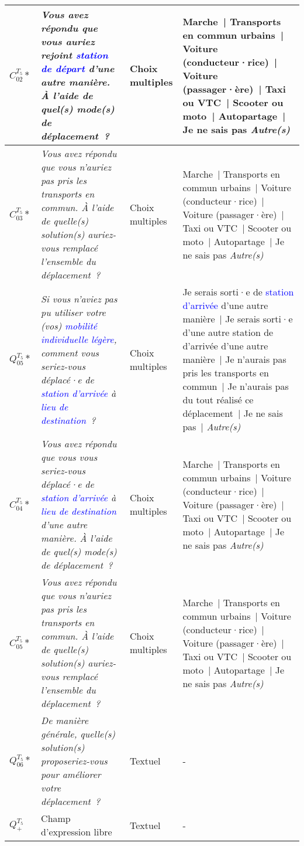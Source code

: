 \begin{table}[h!]
{\begin{tabular}{p{}p{}p{}p{}}
\hline
   \small{\(C_{02}^{T_{5}}*\)} & \small{\textsl{Vous avez répondu que vous auriez rejoint \textcolor{blue}{station de départ} d'une autre manière. À l'aide de quel(s) mode(s) de déplacement~?}} & \small{Choix multiples} & \small{Marche~| Transports en commun urbains~| Voiture (conducteur·rice)~| Voiture (passager·ère)~| Taxi ou VTC~| Scooter ou moto~| Autopartage~| Je ne sais pas \textsl{Autre(s)}}\\
\hline
   \small{\(C_{03}^{T_{5}}*\)} & \small{\textsl{Vous avez répondu que vous n'auriez pas pris les transports en commun. À l'aide de quelle(s) solution(s) auriez-vous remplacé l'ensemble du déplacement~?}} & \small{Choix multiples} & \small{Marche~| Transports en commun urbains~| Voiture (conducteur·rice)~| Voiture (passager·ère)~| Taxi ou VTC~| Scooter ou moto~| Autopartage~| Je ne sais pas \textsl{Autre(s)}}\\
\hline
   \small{\textbf{\(Q_{05}^{T_{5}}*\)}} & \small{\textsl{Si vous n'aviez pas pu utiliser votre (vos) \textcolor{blue}{mobilité individuelle légère}, comment vous seriez-vous déplacé·e de \textcolor{blue}{station d'arrivée} à \textcolor{blue}{lieu de destination}~?}} & \small{Choix multiples} & \small{Je serais sorti·e de \textcolor{blue}{station d'arrivée} d'une autre manière~| Je serais sorti·e d'une autre station de d'arrivée d'une autre manière~| Je n'aurais pas pris les transports en commun~| Je n'aurais pas du tout réalisé ce déplacement~| Je ne sais pas~| \textsl{Autre(s)}}\\
\hline
   \small{\(C_{04}^{T_{5}}*\)} & \small{\textsl{Vous avez répondu que vous vous seriez-vous déplacé·e de \textcolor{blue}{station d'arrivée} à \textcolor{blue}{lieu de destination} d'une autre manière. À l'aide de quel(s) mode(s) de déplacement~?}} & \small{Choix multiples} & \small{Marche~| Transports en commun urbains~| Voiture (conducteur·rice)~| Voiture (passager·ère)~| Taxi ou VTC~| Scooter ou moto~| Autopartage~| Je ne sais pas \textsl{Autre(s)}}\\
\hline
   \small{\(C_{05}^{T_{5}}*\)} & \small{\textsl{Vous avez répondu que vous n'auriez pas pris les transports en commun. À l'aide de quelle(s) solution(s) auriez-vous remplacé l'ensemble du déplacement~?}} & \small{Choix multiples} & \small{Marche~| Transports en commun urbains~| Voiture (conducteur·rice)~| Voiture (passager·ère)~| Taxi ou VTC~| Scooter ou moto~| Autopartage~| Je ne sais pas \textsl{Autre(s)}}\\
\hline
   \small{\textbf{\(Q_{06}^{T_{5}}*\)}} & \small{\textsl{De manière générale, quelle(s) solution(s) proposeriez-vous pour améliorer votre déplacement~?}} & \small{Textuel} & \small{-}\\
   \small{\textbf{\(Q_{+}^{T_{5}}\)}} & \small{Champ d'expression libre} & \small{Textuel} & \small{-}\\
      \hline
    \end{tabular}}
    \caption*{}
    \vspace{5pt}
        \end{table}

